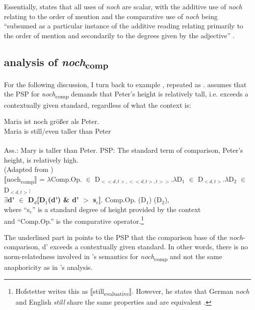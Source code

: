 \documentclass[output=paper]{langsci/langscibook}
\begin{document}
\noindent Essentially, \citeauthor{umbach2009a_comp} states that all uses of \textit{noch} are scalar, with the additive use of \textit{noch} relating to the order of mention and the comparative use of \textit{noch} being ``subsumed as a particular instance of the additive reading relating primarily to the order of mention and secondarily to the degrees given by the adjective'' \citep[14]{umbach2009a_comp}.

\subsection{ analysis of \textit{noch}\textsubscript{comp}}

For the following discussion, I turn back to example , repeated as . \citet{Hofstetter2013} assumes that the PSP for \textit{noch}\textsubscript{comp} demands that Peter's height is relatively tall, i.e. exceeds a contextually given standard, regardless of what the context is:

\ea\gll Maria ist noch größer als Peter.\\
Maria is still/even taller than Peter\\
 \label{NOCH_COMP_EXP_repeat}\\
\ex \label{NOCH_COMP_meaning_components} \ea Ass.: Mary is taller than Peter.
\ex PSP: The standard term of comparison, Peter's height, is relatively high.\label{NOCH_COMP_PSP_00} \\
\z
\ex (Adapted from \citealt[2/59, emphasis mine]{Hofstetter2013})\\\relax $⟦$noch\textsubscript{comp}$⟧$ = $\lambda$Comp.Op. $\in$ D$_{<<d,t>,<<d,t>,t>>}$.$\lambda$D$_1$ $\in$ D$_{<d,t>}$.$\lambda$D$_2$ $\in$ D$_{<d,t>}$: \\\textbf{$\exists$d' $\in$ D$_d$[D$_1$(d') \& d' $>$ s$_c$]}. Comp.Op. (D$_1$) (D$_2$),\\ where ``s$_c$'' is a standard degree of height provided by the context \\and ``Comp.Op.'' is the comparative operator.\footnote{Hofstetter writes this as $⟦$still\textsubscript{evaluative}$⟧$. However, he states that German \textit{noch} and English \textit{still} share the same properties and are equivalent \citep[31]{Hofstetter2013}.} \label{HS_entry_comp}
\z

The underlined part in  points to the PSP that the comparison base of the \textit{noch}-comparison, d' exceeds a contextually given standard. In other words, there is no norm-relatedness involved in \citeauthor{Hofstetter2013}'s semantics for \textit{noch}\textsubscript{comp} and not the same anaphoricity as in \citeauthor{umbach2009a_comp}'s \citeyearpar{umbach2009a_comp} analysis.\largerpage
\end{document}
